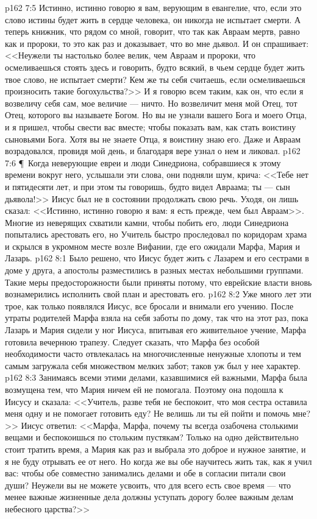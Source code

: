 \vs p162 7:5 Истинно, истинно говорю я вам, верующим в евангелие, что, если это слово истины будет жить в сердце человека, он никогда не испытает смерти. А теперь книжник, что рядом со мной, говорит, что так как Авраам мертв, равно как и пророки, то это как раз и доказывает, что во мне дьявол. И он спрашивает: <<Неужели ты настолько более велик, чем Авраам и пророки, что осмеливаешься стоять здесь и говорить, будто всякий, в чьем сердце будет жить твое слово, не испытает смерти? Кем же ты себя считаешь, если осмеливаешься произносить такие богохульства?>> И я говорю всем таким, как он, что если я возвеличу себя сам, мое величие --- ничто. Но возвеличит меня мой Отец, тот Отец, которого вы называете Богом. Но вы не узнали вашего Бога и моего Отца, и я пришел, чтобы свести вас вместе; чтобы показать вам, как стать воистину сыновьями Бога. Хотя вы не знаете Отца, я воистину знаю его. Даже и Авраам возрадовался, провидя мой день, и благодаря вере узнал о нем и ликовал.
\vs p162 7:6 \P\ Когда неверующие евреи и люди Синедриона, собравшиеся к этому времени вокруг него, услышали эти слова, они подняли шум, крича: <<Тебе нет и пятидесяти лет, и при этом ты говоришь, будто видел Авраама; ты --- сын дьявола!>> Иисус был не в состоянии продолжать свою речь. Уходя, он лишь сказал: <<Истинно, истинно говорю я вам: я есть прежде, чем был Авраам>>. Многие из неверящих схватили камни, чтобы побить его, люди Синедриона попытались арестовать его, но Учитель быстро проследовал по коридорам храма и скрылся в укромном месте возле Вифании, где его ожидали Марфа, Мария и Лазарь.
\vs p162 8:1 Было решено, что Иисус будет жить с Лазарем и его сестрами в доме у друга, а апостолы разместились в разных местах небольшими группами. Такие меры предосторожности были приняты потому, что еврейские власти вновь вознамерились исполнить свой план и арестовать его.
\vs p162 8:2 Уже много лет эти трое, как только появлялся Иисус, все бросали и внимали его учению. После утраты родителей Марфа взяла на себя заботы по дому, так что на этот раз, пока Лазарь и Мария сидели у ног Иисуса, впитывая его живительное учение, Марфа готовила вечернюю трапезу. Следует сказать, что Марфа без особой необходимости часто отвлекалась на многочисленные ненужные хлопоты и тем самым загружала себя множеством мелких забот; таков уж был у нее характер.
\vs p162 8:3 Занимаясь всеми этими делами, казавшимися ей важными, Марфа была возмущена тем, что Мария ничем ей не помогала. Поэтому она подошла к Иисусу и сказала: <<Учитель, разве тебя не беспокоит, что моя сестра оставила меня одну и не помогает готовить еду? Не велишь ли ты ей пойти и помочь мне?>> Иисус ответил: <<Марфа, Марфа, почему ты всегда озабочена столькими вещами и беспокоишься по стольким пустякам? Только на одно действительно стоит тратить время, а Мария как раз и выбрала это доброе и нужное занятие, и я не буду отрывать ее от него. Но когда же вы обе научитесь жить так, как я учил вас: чтобы обе совместно занимались делами и обе в согласии питали свои души? Неужели вы не можете усвоить, что для всего есть свое время --- что менее важные жизненные дела должны уступать дорогу более важным делам небесного царства?>>
